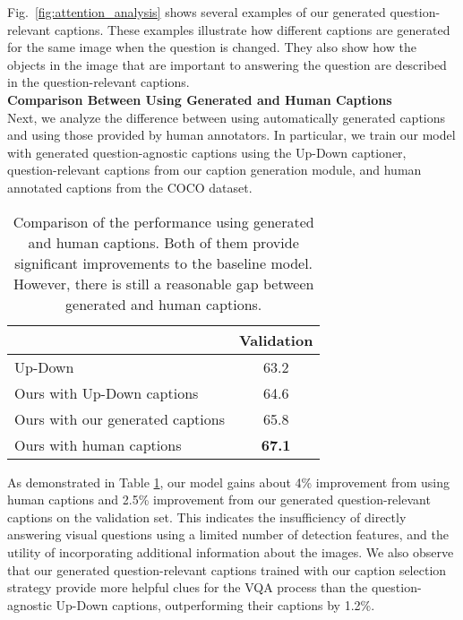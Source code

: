 \documentclass[11pt,a4paper]{article}
\begin{document}
Fig.\ \ref{fig:attention_analysis} shows several examples of our generated question-relevant captions. These examples illustrate how different captions are generated for the same image when the question is changed. They also
show how the objects in the image that are important to answering the question are described in the question-relevant captions.\\

\noindent\textbf{Comparison Between Using Generated and Human Captions}\\
Next, we analyze the difference between using automatically generated captions and using those provided by human annotators. 
In particular, we train our model with generated question-agnostic captions using the Up-Down \cite{anderson2017bottom} captioner, question-relevant captions from our caption generation module, and human annotated captions from the COCO dataset. 

\begin{table}[h]
\centering
\begin{tabular}{l|c}
\hline \toprule
                  & Validation \\ \hline
Up-Down \cite{anderson2017bottom} &  63.2\\
Ours with Up-Down captions &    64.6\\
Ours with our generated captions &    65.8\\
Ours with human captions &    \textbf{67.1} \\\bottomrule
\end{tabular}
\caption{Comparison of the performance using generated and human captions. Both of them provide significant improvements to the baseline model. However, there is still a reasonable gap between generated and human captions.}
\label{tab:gen_anno_compare}
\end{table}

As demonstrated in Table \ref{tab:gen_anno_compare}, our model gains about 4\% improvement from using human captions and 2.5\% improvement from our generated question-relevant captions on the validation set. This indicates the insufficiency of directly answering visual questions using a limited number of detection features, and the utility of incorporating additional information about the images. We also observe that our generated question-relevant captions trained with our caption selection strategy provide more helpful clues for the VQA process than the question-agnostic Up-Down captions, outperforming their captions by 1.2\%. \\
\end{document}
